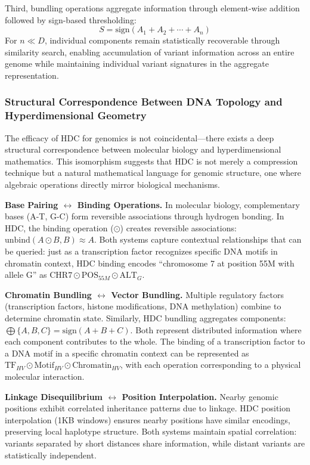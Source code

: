 \documentclass[11pt,letterpaper]{article}
\begin{document}
Third, bundling operations aggregate information through element-wise addition followed by sign-based thresholding:
\begin{equation}
S = \text{sign}(A_1 + A_2 + \cdots + A_n)
\end{equation}
For $n \ll D$, individual components remain statistically recoverable through similarity search, enabling accumulation of variant information across an entire genome while maintaining individual variant signatures in the aggregate representation.

\subsubsection{Structural Correspondence Between DNA Topology and Hyperdimensional Geometry}

The efficacy of HDC for genomics is not coincidental---there exists a deep structural correspondence between molecular biology and hyperdimensional mathematics. This isomorphism suggests that HDC is not merely a compression technique but a natural mathematical language for genomic structure, one where algebraic operations directly mirror biological mechanisms.

\textbf{Base Pairing $\leftrightarrow$ Binding Operations.} In molecular biology, complementary bases (A-T, G-C) form reversible associations through hydrogen bonding. In HDC, the binding operation ($\odot$) creates reversible associations: $\text{unbind}(A \odot B, B) \approx A$. Both systems capture contextual relationships that can be queried: just as a transcription factor recognizes specific DNA motifs in chromatin context, HDC binding encodes ``chromosome 7 at position 55M with allele G'' as $\text{CHR7} \odot \text{POS}_{55M} \odot \text{ALT}_G$.

\textbf{Chromatin Bundling $\leftrightarrow$ Vector Bundling.} Multiple regulatory factors (transcription factors, histone modifications, DNA methylation) combine to determine chromatin state. Similarly, HDC bundling aggregates components: $\bigoplus\{A, B, C\} = \text{sign}(A + B + C)$. Both represent distributed information where each component contributes to the whole. The binding of a transcription factor to a DNA motif in a specific chromatin context can be represented as $\text{TF}_{HV} \odot \text{Motif}_{HV} \odot \text{Chromatin}_{HV}$, with each operation corresponding to a physical molecular interaction.

\textbf{Linkage Disequilibrium $\leftrightarrow$ Position Interpolation.} Nearby genomic positions exhibit correlated inheritance patterns due to linkage. HDC position interpolation (1KB windows) ensures nearby positions have similar encodings, preserving local haplotype structure. Both systems maintain spatial correlation: variants separated by short distances share information, while distant variants are statistically independent.
\end{document}
